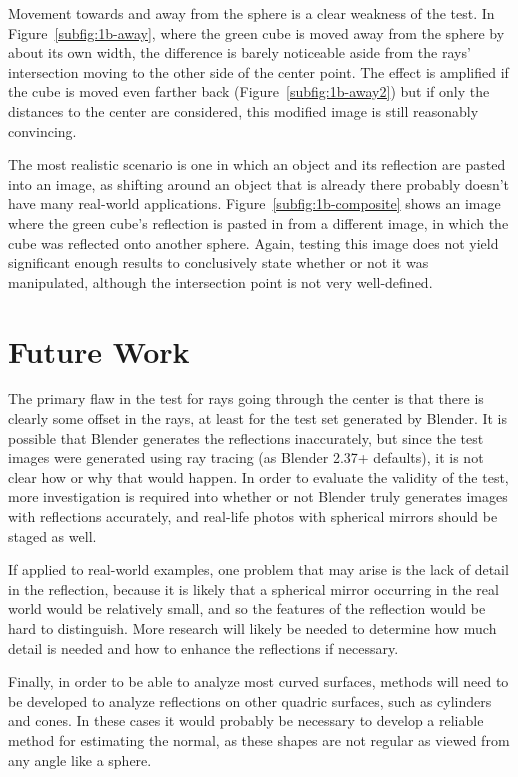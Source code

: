 \documentclass{thesis}
\begin{document}
Movement towards and away from the sphere is a clear weakness of the test. In Figure~\ref{subfig:1b-away}, where the green cube is moved away from the sphere by about its own width, the difference is barely noticeable aside from the rays' intersection moving to the other side of the center point. The effect is amplified if the cube is moved even farther back (Figure~\ref{subfig:1b-away2}) but if only the distances to the center are considered, this modified image is still reasonably convincing.

The most realistic scenario is one in which an object and its reflection are pasted into an image, as shifting around an object that is already there probably doesn't have many real-world applications. Figure~\ref{subfig:1b-composite} shows an image where the green cube's reflection is pasted in from a different image, in which the cube was reflected onto another sphere. Again, testing this image does not yield significant enough results to conclusively state whether or not it was manipulated, although the intersection point is not very well-defined.

\chapter{Future Work}
The primary flaw in the test for rays going through the center is that there is clearly some offset in the rays, at least for the test set generated by Blender. It is possible that Blender generates the reflections inaccurately, but since the test images were generated using ray tracing (as Blender 2.37+ defaults), it is not clear how or why that would happen. In order to evaluate the validity of the test, more investigation is required into whether or not Blender truly generates images with reflections accurately, and real-life photos with spherical mirrors should be staged as well.

If applied to real-world examples, one problem that may arise is the lack of detail in the reflection, because it is likely that a spherical mirror occurring in the real world would be relatively small, and so the features of the reflection would be hard to distinguish. More research will likely be needed to determine how much detail is needed and how to enhance the reflections if necessary.

Finally, in order to be able to analyze most curved surfaces, methods will need to be developed to analyze reflections on other quadric surfaces, such as cylinders and cones. In these cases it would probably be necessary to develop a reliable method for estimating the normal, as these shapes are not regular as viewed from any angle like a sphere.



\clearpage

%


\end{document}
